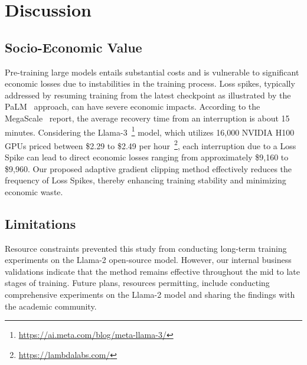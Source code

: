 \section{Discussion}
\subsection{Socio-Economic Value}
Pre-training large models entails substantial costs and is vulnerable to significant economic losses due to instabilities in the training process. Loss spikes, typically addressed by resuming training from the latest checkpoint as illustrated by the PaLM~\cite{chowdhery2023palm} approach, can have severe economic impacts. According to the MegaScale~\cite{jiang2024megascale} report, the average recovery time from an interruption is about 15 minutes. Considering the Llama-3~\footnote{\url{https://ai.meta.com/blog/meta-llama-3/}} model, which utilizes 16,000 NVIDIA H100 GPUs priced between \$2.29 to \$2.49 per hour~\footnote{\url{https://lambdalabs.com/}}, each interruption due to a Loss Spike can lead to direct economic losses ranging from approximately \$9,160 to \$9,960. Our proposed adaptive gradient clipping method effectively reduces the frequency of Loss Spikes, thereby enhancing training stability and minimizing economic waste.

\subsection{Limitations}
Resource constraints prevented this study from conducting long-term training experiments on the Llama-2 open-source model. However, our internal business validations indicate that the method remains effective throughout the mid to late stages of training. Future plans, resources permitting, include conducting comprehensive experiments on the Llama-2 model and sharing the findings with the academic community.
